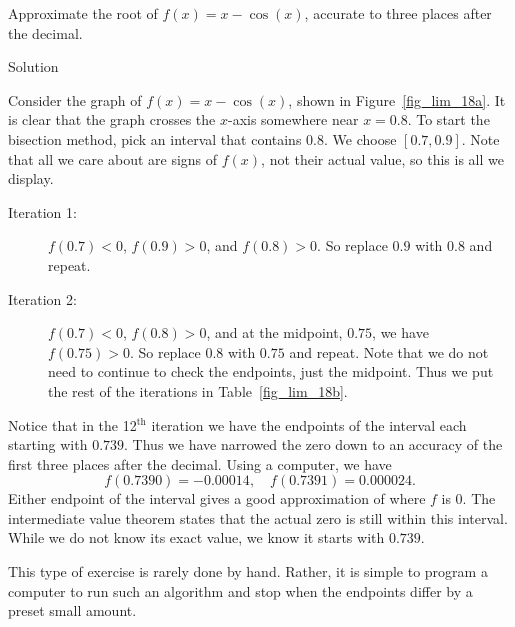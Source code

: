 \begin{example}\label{ex_bisect_method}
Approximate the root of $f(x) = x-\cos (x)$, accurate to three places after the decimal.

Solution 


Consider the graph of $f(x) = x-\cos (x)$, shown in Figure~\ref{fig_lim_18a}. It is clear that the graph crosses the $x$-axis somewhere near $x=0.8$. To start the bisection method, pick an interval that contains $0.8$. We choose $[0.7,0.9]$. Note that all we care about are signs of $f(x)$, not their actual value, so this is all we display.


		\begin{description}
		\item [Iteration 1:] $f(0.7) < 0$, $f(0.9) > 0$, and $f(0.8) >0$. So replace $0.9$ with $0.8$ and repeat.
		\item	[Iteration 2:]	$f(0.7)<0$, $f(0.8) > 0$, and at the midpoint, $0.75$, we have $f(0.75) >0 $. So replace $0.8$ with $0.75$ and repeat. Note that we do not need to continue to check the endpoints, just the midpoint. Thus we put the rest of the iterations in Table~\ref{fig_lim_18b}.
		\end{description}
		


			
Notice that in the 12$^\text{th}$ iteration we have the endpoints of the interval each starting with $0.739$. Thus we have narrowed the zero down to an accuracy of the first three places after the decimal. Using a computer, we have 
$$ f(0.7390) = -0.00014, \quad f(0.7391) = 0.000024.$$ Either endpoint of the interval gives a good approximation of where $f$ is 0. The intermediate value theorem states that the actual zero is still within this interval. While we do not know its exact value, we know it starts with $0.739$. 

This type of exercise is rarely done by hand. Rather, it is simple to program a computer to run such an algorithm and stop when the endpoints differ by a preset small amount. 
\end{example}

